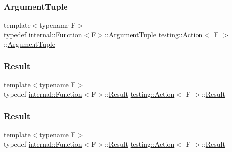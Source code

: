 \mbox{\label{classtesting_1_1_action_ae27fda510696a9294f991de5b1abfaf2}} 
\subsubsection{\texorpdfstring{ArgumentTuple}{ArgumentTuple}\hspace{0.1cm}{\footnotesize\ttfamily [3/3]}}
{\footnotesize\ttfamily template$<$typename F$>$ \\
typedef \mbox{\hyperlink{structtesting_1_1internal_1_1_function}{internal\+::\+Function}}$<$F$>$\+::\mbox{\hyperlink{classtesting_1_1_action_ae27fda510696a9294f991de5b1abfaf2}{Argument\+Tuple}} \mbox{\hyperlink{classtesting_1_1_action}{testing\+::\+Action}}$<$ F $>$\+::\mbox{\hyperlink{classtesting_1_1_action_ae27fda510696a9294f991de5b1abfaf2}{Argument\+Tuple}}}

\mbox{\label{classtesting_1_1_action_a9af08a21ad329331fde856cba9b6dea2}} 
\subsubsection{\texorpdfstring{Result}{Result}\hspace{0.1cm}{\footnotesize\ttfamily [1/3]}}
{\footnotesize\ttfamily template$<$typename F$>$ \\
typedef \mbox{\hyperlink{structtesting_1_1internal_1_1_function}{internal\+::\+Function}}$<$F$>$\+::\mbox{\hyperlink{classtesting_1_1_action_a9af08a21ad329331fde856cba9b6dea2}{Result}} \mbox{\hyperlink{classtesting_1_1_action}{testing\+::\+Action}}$<$ F $>$\+::\mbox{\hyperlink{classtesting_1_1_action_a9af08a21ad329331fde856cba9b6dea2}{Result}}}

\mbox{\label{classtesting_1_1_action_a9af08a21ad329331fde856cba9b6dea2}} 
\subsubsection{\texorpdfstring{Result}{Result}\hspace{0.1cm}{\footnotesize\ttfamily [2/3]}}
{\footnotesize\ttfamily template$<$typename F$>$ \\
typedef \mbox{\hyperlink{structtesting_1_1internal_1_1_function}{internal\+::\+Function}}$<$F$>$\+::\mbox{\hyperlink{classtesting_1_1_action_a9af08a21ad329331fde856cba9b6dea2}{Result}} \mbox{\hyperlink{classtesting_1_1_action}{testing\+::\+Action}}$<$ F $>$\+::\mbox{\hyperlink{classtesting_1_1_action_a9af08a21ad329331fde856cba9b6dea2}{Result}}}


